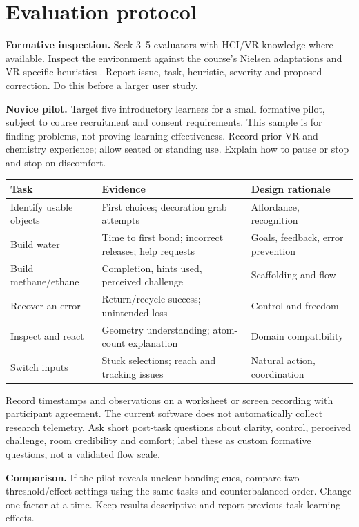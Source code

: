 \section*{Evaluation protocol}
\textbf{Formative inspection.} Seek 3--5 evaluators with HCI/VR knowledge where available. Inspect the environment against the course's Nielsen adaptations and VR-specific heuristics \cite{gain}. Report issue, task, heuristic, severity and proposed correction. Do this before a larger user study.

\textbf{Novice pilot.} Target five introductory learners for a small formative pilot, subject to course recruitment and consent requirements. This sample is for finding problems, not proving learning effectiveness. Record prior VR and chemistry experience; allow seated or standing use. Explain how to pause or stop and stop on discomfort.

\begin{tabularx}{\linewidth}{@{}p{29mm}YY@{}}\toprule
Task & Evidence & Design rationale\\\midrule
Identify usable objects & First choices; decoration grab attempts & Affordance, recognition\\
Build water & Time to first bond; incorrect releases; help requests & Goals, feedback, error prevention\\
Build methane/ethane & Completion, hints used, perceived challenge & Scaffolding and flow\\
Recover an error & Return/recycle success; unintended loss & Control and freedom\\
Inspect and react & Geometry understanding; atom-count explanation & Domain compatibility\\
Switch inputs & Stuck selections; reach and tracking issues & Natural action, coordination\\\bottomrule
\end{tabularx}

Record timestamps and observations on a worksheet or screen recording with participant agreement. The current software does not automatically collect research telemetry. Ask short post-task questions about clarity, control, perceived challenge, room credibility and comfort; label these as custom formative questions, not a validated flow scale.

\textbf{Comparison.} If the pilot reveals unclear bonding cues, compare two threshold/effect settings using the same tasks and counterbalanced order. Change one factor at a time. Keep results descriptive and report previous-task learning effects.

